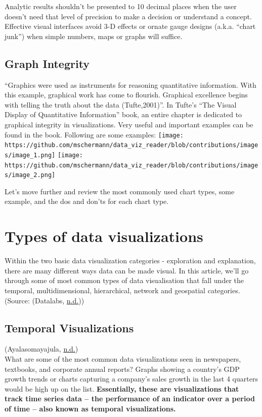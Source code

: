 \documentclass[]{book}
\begin{document}
Analytic results shouldn't be presented to 10 decimal places when the user doesn't need that level of precision to make a decision or understand a concept. Effective visual interfaces avoid 3-D effects or ornate gauge designs (a.k.a. ``chart junk'') when simple numbers, maps or graphs will suffice.

\hypertarget{graph-integrity}{%
\subsection{Graph Integrity}\label{graph-integrity}}

``Graphics were used as instruments for reasoning quantitative information. With this example, graphical work has come to flourish. Graphical excellence begins with telling the truth about the data (Tufte,2001)''.
In Tufte's ``The Visual Display of Quantitative Information'' book, an entire chapter is dedicated to graphical integrity in visualizations. Very useful and important examples can be found in the book. Following are some examples:
\texttt{[image: https://github.com/mschermann/data\_viz\_reader/blob/contributions/images/image\_1.png]}
\texttt{[image: https://github.com/mschermann/data\_viz\_reader/blob/contributions/images/image\_2.png]}

Let's move further and review the most commonly used chart types, some example, and the dos and don'ts for each chart type.

\hypertarget{types-of-data-visualizations}{%
\section{Types of data visualizations}\label{types-of-data-visualizations}}

Within the two basic data visualization categories - exploration and explanation, there are many different ways data can be made visual. In this article, we'll go through some of most common types of data visualisation that fall under the temporal, multidimensional, hierarchical, network and geospatial categories.
(Source: (Datalabs, \protect\hyperlink{ref-chart-desp}{n.d.}))

\hypertarget{temporal-visualizations}{%
\subsection{Temporal Visualizations}\label{temporal-visualizations}}

(Ayalasomayajula, \protect\hyperlink{ref-aya-time-series}{n.d.})\\
What are some of the most common data visualizations seen in newspapers, textbooks, and corporate annual reports? Graphs showing a country's GDP growth trends or charts capturing a company's sales growth in the last 4 quarters would be high up on the list. \textbf{Essentially, these are visualizations that track time series data -- the performance of an indicator over a period of time -- also known as temporal visualizations.}
\end{document}

